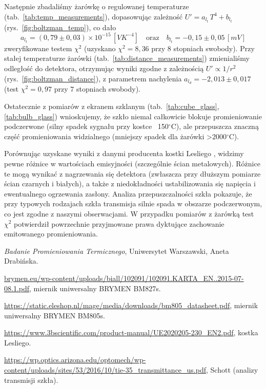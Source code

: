 \documentclass[12pt]{article}
\begin{document}
Następnie zbadaliśmy żarówkę o regulowanej temperaturze (tab.~\ref{tab:temp_measurements}), dopasowując zależność $U' = a_{l_t}\,T^4 + b_{l_t}$ (rys.~\ref{fig:boltzman_temp}), co dało 
\[
    a_{l_t} = (0{,}79 \pm 0{,}03) \times 10^{-15}\,[VK^{-4}] \quad \text{oraz} \quad b_{l_t} = -0{,}15 \pm 0{,}05 \, [mV]
\]
zweryfikowane testem $\chi^2$ (uzyskano $\chi^2=8{,}36$ przy 8 stopniach swobody). Przy stałej temperaturze żarówki (tab.~\ref{tab:distance_measurements}) zmienialiśmy odległość do detektora, otrzymując wyniki zgodne z zależnością $U'\propto 1/r^2$ (rys.~\ref{fig:boltzman_distance}), z parametrem nachylenia $a_{l_d}=-2{,}013 \pm 0{,}017$ (test $\chi^2=0{,}97$ przy $7$ stopniach swobody). 

Ostatecznie z pomiarów z ekranem szklanym (tab.~\ref{tab:cube_glass}, \ref{tab:bulb_glass}) wnioskujemy, że szkło niemal całkowicie blokuje promieniowanie podczerwone (silny spadek sygnału przy kostce ~150$^\circ$C), ale przepuszcza znaczną część promieniowania widzialnego (mniejszy spadek dla żarówki >2000$^\circ$C).

Porównując uzyskane wyniki z danymi producenta kostki Lesliego \cite{cube}, widzimy pewne różnice w wartościach emisyjności (szczególnie ścian metalowych). Różnice te mogą wynikać z nagrzewania się detektora (zwłaszcza przy dłuższym pomiarze ścian czarnych i białych), a także z niedokładności ustabilizowania się napięcia i ewentualnego ogrzewania zasłony. 
Analiza przepuszczalności szkła \cite{glass} pokazuje, że przy typowych rodzajach szkła transmisja silnie spada w obszarze podczerwonym, co jest zgodne z naszymi obserwacjami.
W przypadku pomiarów z żarówką test $\chi^2$ potwierdził powrzechnie przyjmowane prawa dyktujące zachowanie emitowanego promieniowania.

\newpage
\begin{thebibliography}{5}

	\emph{Badanie Promieniowania Termicznego}, Uniwersytet Warszawski, Aneta Drabińska.

	\url{brymen.eu/wp-content/uploads/biall/102091/102091.KARTA_EN..2015-07-08.1.pdf}, miernik uniwersalny BRYMEN BM827s.

	\url{https://static.eleshop.nl/mage/media/downloads/bm805_datasheet.pdf}, miernik uniwersalny BRYMEN BM805s.

    \url{https://www.3bscientific.com/product-manual/UE2020205-230_EN2.pdf}, kostka Lesliego.

    \url{https://wp.optics.arizona.edu/optomech/wp-content/uploads/sites/53/2016/10/tie-35_transmittance_us.pdf}, Schott (analizy transmisji szkła).

\end{thebibliography}
\end{document}
